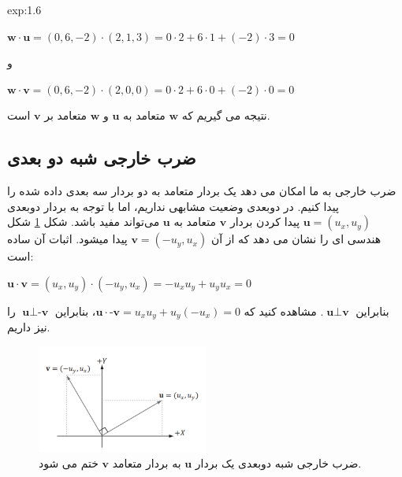 {\begin{spacing}{1.5}
\begin{example}{exp:1.6}
            \begin{center}
                $\textbf{w}\cdot\textbf{u}=(0,6,-2)\cdot(2,1,3)=0\cdot 2+6\cdot 1+(-2)\cdot 3=0$

                و

                $\textbf{w}\cdot\textbf{v}=(0,6,-2)\cdot(2,0,0)=0\cdot 2+6\cdot 0+(-2)\cdot 0=0$
            \end{center}

            نتیجه می گیریم که $\textbf{w}$ متعامد به $\textbf{u}$ و $\textbf{w}$ متعامد بر $\textbf{v}$ است.
        \end{example}
    \end{spacing}
}

\subsection{\textbf{ضرب خارجی شبه دو بعدی}}
\label{subsec:1.4.1}
{
    \Large
    \begin{spacing}{1.5}
        ضرب خارجی به ما امکان می دهد یک بردار متعامد به دو بردار سه بعدی داده شده را پیدا کنیم.
        در دوبعدی وضعیت مشابهی نداریم،
        اما با توجه به بردار دوبعدی $\textbf{u}=(u_{x},u_{y})$ پیدا کردن بردار $\textbf{v}$ متعامد به $\textbf{u}$ می‌تواند مفید باشد.
        شکل \ref{fig:4.Session.1.1.14} شکل هندسی ای را نشان می دهد که از آن $\textbf{v}=(-u_{y},u_{x})$ پیدا میشود.
        اثبات آن ساده است:

        \begin{center}
            $\textbf{u}\cdot\textbf{v}=(u_{x},u_{y})\cdot(-u_{y},u_{x})=-u_{x}u_{y}+u_{y}u_{x}=0$
        \end{center}

        بنابراین $\textbf{u}\perp\textbf{v}$.
        مشاهده کنید که $\textbf{u}\cdot\textbf{-v}=u_{x}u_{y}+u_{y}(-u_{x})=0$، بنابراین $\textbf{u}\perp\textbf{-v}$ را نیز داریم.

        \begin{figure}[H]
            \centering
            \setlength{\belowcaptionskip}{-10pt}
            \includegraphics[width=0.5\textwidth]{Images/4/1/4.Session.1.1.14}
            \caption{ضرب خارجی شبه دوبعدی یک بردار $\textbf{u}$ به بردار متعامد $\textbf{v}$ ختم می شود.}
            \label{fig:4.Session.1.1.14}
        \end{figure}
    \end{spacing}
}

